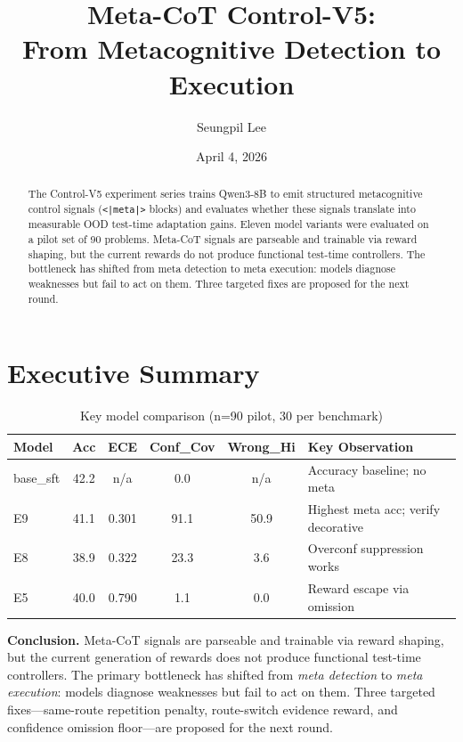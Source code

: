 \documentclass[11pt,a4paper]{article}
\title{\textbf{Meta-CoT Control-V5:\\From Metacognitive Detection to Execution}}
\author{Seungpil Lee}
\date{April 4, 2026}
\newcommand{\tok}[1]{\texttt{#1}}
\begin{document}
\maketitle

\begin{abstract}
The Control-V5 experiment series trains Qwen3-8B to emit structured metacognitive control signals (\tok{<|meta|>} blocks) and evaluates whether these signals translate into measurable OOD test-time adaptation gains. Eleven model variants were evaluated on a pilot set of 90 problems. Meta-CoT signals are parseable and trainable via reward shaping, but the current rewards do not produce functional test-time controllers. The bottleneck has shifted from meta detection to meta execution: models diagnose weaknesses but fail to act on them. Three targeted fixes are proposed for the next round.
\end{abstract}

\tableofcontents
\newpage

\section{Executive Summary}

\begin{table}[H]
\centering
\caption{Key model comparison (n=90 pilot, 30 per benchmark)}
\label{tab:exec-summary}
\begin{tabular}{lccccl}
\toprule
Model & Acc & ECE & Conf\_Cov & Wrong\_Hi & Key Observation \\
\midrule
base\_sft & 42.2 & n/a & 0.0 & n/a & Accuracy baseline; no meta \\
E9 & 41.1 & 0.301 & 91.1 & 50.9 & Highest meta acc; verify decorative \\
E8 & 38.9 & 0.322 & 23.3 & 3.6 & Overconf suppression works \\
E5 & 40.0 & 0.790 & 1.1 & 0.0 & Reward escape via omission \\
\bottomrule
\end{tabular}
\end{table}

\textbf{Conclusion.} Meta-CoT signals are parseable and trainable via reward shaping, but the current generation of rewards does not produce functional test-time controllers. The primary bottleneck has shifted from \emph{meta detection} to \emph{meta execution}: models diagnose weaknesses but fail to act on them. Three targeted fixes---same-route repetition penalty, route-switch evidence reward, and confidence omission floor---are proposed for the next round.
\end{document}
